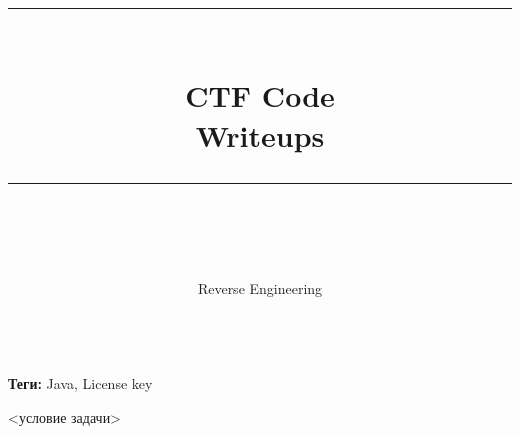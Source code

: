 \documentclass[idxtotoc,hyperref,openany,oneside]{files/reverse} %
\newcommand{\HRule}{\rule{\linewidth}{0.5mm}} %
\begin{document}

\frontmatter %
\title{
\begin{center}
\HRule \\[0.4cm]
{\Huge \bfseries CTF Code \\[0.5cm] \Large Writeups}\\[0.4cm] %
\HRule \\[1.5cm]
\end{center}
}
\author{\Huge Reverse Engineering \\ \\[2cm]} %
\maketitle

\tableofcontents

\mainmatter %












\textbf{Теги:} Java, License key\vspace{\baselineskip}

\begin{tcolorbox}
<условие задачи>
\end{tcolorbox}
\end{document}
